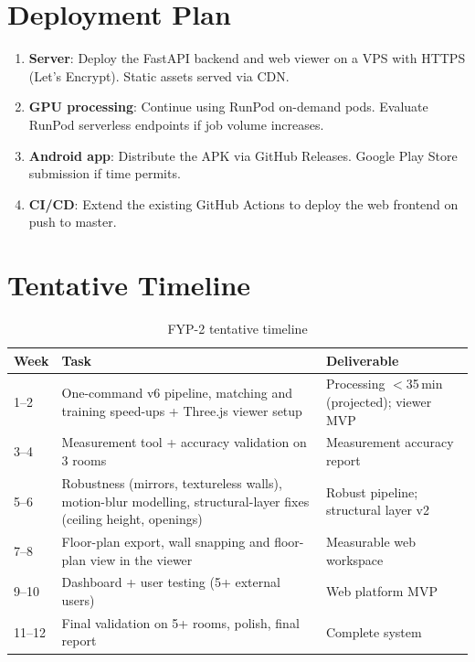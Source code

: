 \section{Deployment Plan}
\begin{enumerate}
    \item \textbf{Server}: Deploy the FastAPI backend and web viewer on a VPS with HTTPS (Let's Encrypt). Static assets served via CDN.
    \item \textbf{GPU processing}: Continue using RunPod on-demand pods. Evaluate RunPod serverless endpoints if job volume increases.
    \item \textbf{Android app}: Distribute the APK via GitHub Releases. Google Play Store submission if time permits.
    \item \textbf{CI/CD}: Extend the existing GitHub Actions to deploy the web frontend on push to master.
\end{enumerate}

\section{Tentative Timeline}

\begin{table}[htbp]
\centering
\small
\caption{FYP-2 tentative timeline}
\label{tab:fyp2timeline}
\begin{tabular}{p{2.5cm}p{5cm}p{3.5cm}}
\toprule
\textbf{Week} & \textbf{Task} & \textbf{Deliverable} \\
\midrule
1--2 & One-command v6 pipeline, matching and training speed-ups + Three.js viewer setup & Processing $<$35\,min (projected); viewer MVP \\
3--4 & Measurement tool + accuracy validation on 3 rooms & Measurement accuracy report \\
5--6 & Robustness (mirrors, textureless walls), motion-blur modelling, structural-layer fixes (ceiling height, openings) & Robust pipeline; structural layer v2 \\
7--8 & Floor-plan export, wall snapping and floor-plan view in the viewer & Measurable web workspace \\
9--10 & Dashboard + user testing (5+ external users) & Web platform MVP \\
11--12 & Final validation on 5+ rooms, polish, final report & Complete system \\
\bottomrule
\end{tabular}
\end{table}

